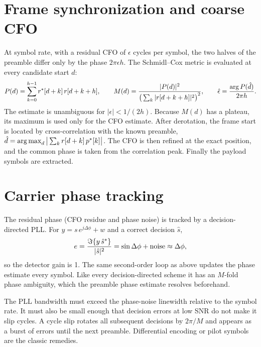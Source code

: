\section{Frame synchronization and coarse CFO}\label{sec:frame-sync}
At symbol rate, with a residual CFO of $\epsilon$ cycles per symbol, the two halves of the
preamble differ only by the phase $2\pi\epsilon h$. The Schmidl--Cox metric is evaluated at
every candidate start $d$:
\begin{equation}
  P(d)=\sum_{k=0}^{h-1}r^{*}[d+k]\,r[d+k+h],\qquad
  M(d)=\frac{|P(d)|^2}{\big(\sum_k|r[d+k+h]|^2\big)^2},\qquad
  \hat\epsilon=\frac{\arg P(\hat d)}{2\pi h}.
\end{equation}
The estimate is unambiguous for $|\epsilon|<1/(2h)$. Because $M(d)$ has a plateau, its maximum is
used only for the CFO estimate. After derotation, the frame start is located by
cross-correlation with the known preamble,
$\hat d=\operatorname*{arg\,max}_d\big|\sum_kr[d+k]\,p^{*}[k]\big|$. The CFO is then refined at the exact
position, and the common phase is taken from the correlation peak. Finally the payload symbols
are extracted.

\section{Carrier phase tracking}
The residual phase (CFO residue and phase noise) is tracked by a decision-directed PLL. For
$y=s\,e^{j\Delta\phi}+w$ and a correct decision $\hat s$,
\begin{equation}
  e=\frac{\Im\{y\,\hat s^{*}\}}{|\hat s|^2}=\sin\Delta\phi+\text{noise}\approx\Delta\phi ,
\end{equation}
so the detector gain is 1. The same second-order loop as above updates the phase estimate
every symbol. Like every decision-directed scheme it has an $M$-fold phase ambiguity, which the
preamble phase estimate resolves beforehand.

\begin{pitfall}
The PLL bandwidth must exceed the phase-noise linewidth relative to the symbol rate. It must
also be small enough that decision errors at low SNR do not make it slip cycles. A cycle slip
rotates all subsequent decisions by $2\pi/M$ and appears as a burst of errors until the next
preamble. Differential encoding or pilot symbols are the classic remedies.
\end{pitfall}
